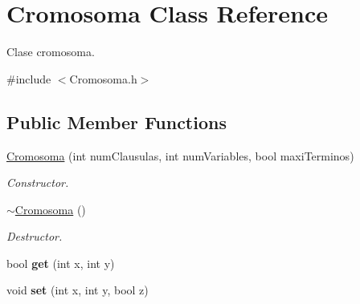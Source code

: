 \hypertarget{classCromosoma}{\section{Cromosoma Class Reference}
\label{classCromosoma}
}


Clase cromosoma.  




{\ttfamily \#include $<$Cromosoma.\-h$>$}

\subsection*{Public Member Functions}
\begin{DoxyCompactItemize}
\item 
\hyperlink{classCromosoma_a8fca0c1bd72c65aac6c2f26494e2c5f9}{Cromosoma} (int num\-Clausulas, int num\-Variables, bool maxi\-Terminos)
\begin{DoxyCompactList}\small\item\em Constructor. \end{DoxyCompactList}\item 
\hyperlink{classCromosoma_a39310d043c187768ba83a1a9c921e966}{$\sim$\-Cromosoma} ()
\begin{DoxyCompactList}\small\item\em Destructor. \end{DoxyCompactList}\item 
\hypertarget{classCromosoma_a59d6a42685e8b6e983b496d8051e4168}{bool {\bfseries get} (int x, int y)}\label{classCromosoma_a59d6a42685e8b6e983b496d8051e4168}

\item 
\hypertarget{classCromosoma_aaf002d2f7f9438e74eeba52892868e83}{void {\bfseries set} (int x, int y, bool z)}\label{classCromosoma_aaf002d2f7f9438e74eeba52892868e83}


\end{DoxyCompactItemize}
